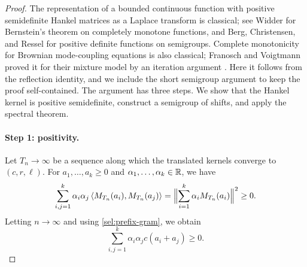 \begin{proof}
The representation of a bounded continuous function with positive semidefinite Hankel matrices as a Laplace transform is classical; see Widder \cite[Chapter~IV, Section~12, Theorems~12a--12b, pp.~160--161]{widder1941} for Bernstein's theorem on completely monotone functions, and Berg, Christensen, and Ressel \cite[Chapter~4, Corollary~4.5, p.~114]{bcr1984} for positive definite functions on semigroups. Complete monotonicity for Brownian mode-coupling equations is also classical; Franosch and Voigtmann proved it for their mixture model by an iteration argument \cite[arXiv version~1, Section~III]{fv2002}. Here it follows from the reflection identity, and we include the short semigroup argument to keep the proof self-contained.
The argument has three steps. We show that the Hankel kernel is positive semidefinite, construct a semigroup of shifts, and apply the spectral theorem.

\paragraph{Step 1: positivity.}
Let $T_n\to\infty$ be a sequence along which the translated kernels converge to $(c,r,\ell)$. For $a_1,\dots,a_k\ge0$ and $\alpha_1,\dots,\alpha_k\in\mathbb R$, we have
\[
 \sum_{i,j=1}^k\alpha_i\alpha_j\left\langle M_{T_n}(a_i),M_{T_n}(a_j)\right\rangle=\Bigl\|\sum_{i=1}^k\alpha_iM_{T_n}(a_i)\Bigr\|^2\ge0.
\]
Letting $n\to\infty$ and using \eqref{sel:prefix-gram}, we obtain
\begin{equation}\label{eq:tree-hankel-positive}
 \sum_{i,j=1}^k\alpha_i\alpha_jc(a_i+a_j)\ge0.
\end{equation}


\end{proof}

